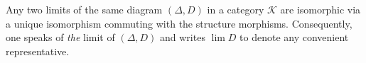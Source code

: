 Any two limits of the same diagram $(\Delta, D)$ in a category $\mathcal{K}$ are isomorphic via a unique isomorphism commuting with the structure morphisms. Consequently, one speaks of \emph{the} limit of $(\Delta, D)$ and writes $\lim D$ to denote any convenient representative.
